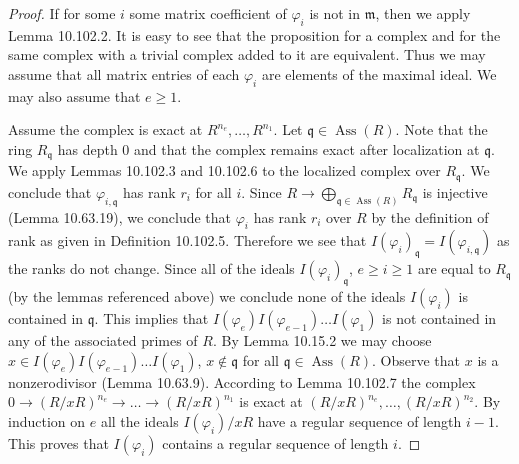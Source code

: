 \documentclass[UTF8,11pt]{ctexart}
\begin{document}
\begin{proof}
If for some $i$ some matrix coefficient of $\varphi_i$ is not in $\mathfrak m$, then we apply Lemma 10.102.2. It is easy to see that the proposition for a complex and for the same complex with a trivial complex added to it are equivalent. Thus we may assume that all matrix entries of each $\varphi_i$ are elements of the maximal ideal. We may also assume that $e\geq1$.

Assume the complex is exact at $R^{n_e},\ldots,R^{n_1}$. Let $\mathfrak q\in\operatorname{Ass}(R)$. Note that the ring $R_{\mathfrak q}$ has depth $0$ and that the complex remains exact after localization at $\mathfrak q$. We apply Lemmas 10.102.3 and 10.102.6 to the localized complex over $R_{\mathfrak q}$. We conclude that $\varphi_{i,\mathfrak q}$ has rank $r_i$ for all $i$. Since $R\to\bigoplus_{\mathfrak q\in\operatorname{Ass}(R)}R_{\mathfrak q}$ is injective (Lemma 10.63.19), we conclude that $\varphi_i$ has rank $r_i$ over $R$ by the definition of rank as given in Definition 10.102.5. Therefore we see that $I(\varphi_i)_{\mathfrak q}=I(\varphi_{i,\mathfrak q})$ as the ranks do not change. Since all of the ideals $I(\varphi_i)_{\mathfrak q}$, $e\geq i\geq1$ are equal to $R_{\mathfrak q}$ (by the lemmas referenced above) we conclude none of the ideals $I(\varphi_i)$ is contained in $\mathfrak q$. This implies that $I(\varphi_e)I(\varphi_{e-1})\ldots I(\varphi_1)$ is not contained in any of the associated primes of $R$. By Lemma 10.15.2 we may choose $x\in I(\varphi_e)I(\varphi_{e-1})\ldots I(\varphi_1)$, $x\notin\mathfrak q$ for all $\mathfrak q\in\operatorname{Ass}(R)$. Observe that $x$ is a nonzerodivisor (Lemma 10.63.9). According to Lemma 10.102.7 the complex $0\to(R/xR)^{n_e}\to\ldots\to(R/xR)^{n_1}$ is exact at $(R/xR)^{n_e},\ldots,(R/xR)^{n_2}$. By induction on $e$ all the ideals $I(\varphi_i)/xR$ have a regular sequence of length $i-1$. This proves that $I(\varphi_i)$ contains a regular sequence of length $i$.


\end{proof}
\end{document}

